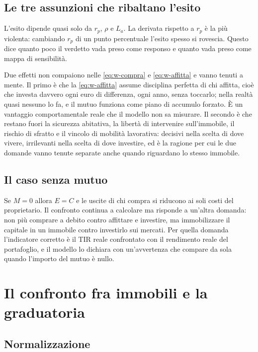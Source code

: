 \documentclass[11pt,a4paper]{article}
\theoremstyle{definition}
\theoremstyle{plain}
\begin{document}
\subsection{Le tre assunzioni che ribaltano l'esito}

L'esito dipende quasi solo da $r_p$, $\rho$ e $L_a$. La derivata rispetto a $r_p$ è la più violenta: cambiando $r_p$ di un punto percentuale l'esito spesso si rovescia. Questo dice quanto poco il verdetto vada preso come responso e quanto vada preso come mappa di sensibilità.

Due effetti non compaiono nelle \eqref{eq:w-compra} e \eqref{eq:w-affitta} e vanno tenuti a mente. Il primo è che la \eqref{eq:w-affitta} assume disciplina perfetta di chi affitta, cioè che investa davvero ogni euro di differenza, ogni anno, senza toccarlo; nella realtà quasi nessuno lo fa, e il mutuo funziona come piano di accumulo forzato. È un vantaggio comportamentale reale che il modello non sa misurare. Il secondo è che restano fuori la sicurezza abitativa, la libertà di intervenire sull'immobile, il rischio di sfratto e il vincolo di mobilità lavorativa: decisivi nella scelta di dove vivere, irrilevanti nella scelta di dove investire, ed è la ragione per cui le due domande vanno tenute separate anche quando riguardano lo stesso immobile.

\subsection{Il caso senza mutuo}

Se $M=0$ allora $E=C$ e le uscite di chi compra si riducono ai soli costi del proprietario. Il confronto continua a calcolare ma risponde a un'altra domanda: non più comprare a debito contro affittare e investire, ma immobilizzare il capitale in un immobile contro investirlo sui mercati. Per quella domanda l'indicatore corretto è il TIR reale confrontato con il rendimento reale del portafoglio, e il modello lo dichiara con un'avvertenza che compare da sola quando l'importo del mutuo è nullo.

\section{Il confronto fra immobili e la graduatoria}

\subsection{Normalizzazione}
\end{document}
